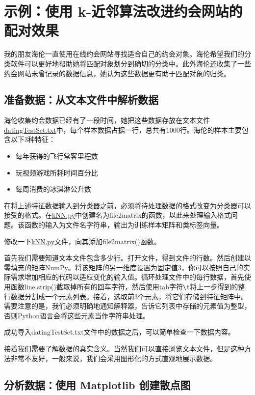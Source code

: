 \section{示例：使用 k-近邻算法改进约会网站的配对效果}
我的朋友海伦一直使用在线约会网站寻找适合自己的约会对象。海伦希望我们的分类软件可以更好地帮助她将匹配对象划分到确切的分类中。此外海伦还收集了一些约会网站未曾记录的数据信息，她认为这些数据更有助于匹配对象的归类。
\subsection{准备数据：从文本文件中解析数据}
海伦收集约会数据已经有了一段时间，她把这些数据存放在文本文件\href{}{datingTestSet.txt}中，每个样本数据占据一行，总共有1000行。海伦的样本主要包含以下3种特征：
\begin{itemize}
    \item 每年获得的飞行常客里程数
    \item 玩视频游戏所耗时间百分比
    \item 每周消费的冰淇淋公升数
\end{itemize}

在将上述特征数据输入到分类器之前，必须将待处理数据的格式改变为分类器可以接受的格式。在\href{https://github.com/JPL-JUNO/Machine-Learning-in-Action/blob/main/Codes/kNN.py}{kNN.py}中创建名为file2matrix的函数，以此来处理输入格式问题。该函数的输入为文件名字符串，输出为训练样本矩阵和类标签向量。

修改一下\href{https://github.com/JPL-JUNO/Machine-Learning-in-Action/blob/main/Codes/kNN.py}{kNN.py}文件，向其添加file2matrix()函数。

首先我们需要知道文本文件包含多少行。打开文件，得到文件的行数。然后创建以零填充的矩阵NumPy。将该矩阵的另一维度设置为固定值3，你可以按照自己的实际需求增加相应的代码以适应变化的输入值。循环处理文件中的每行数据，首先使用函数line.strip()截取掉所有的回车字符，然后使用tab字符\verb|\t|将上一步得到的整行数据分割成一个元素列表。接着，选取前3个元素，将它们存储到特征矩阵中。需要注意的是，我们必须明确地通知解释器，告诉它列表中存储的元素值为整型，否则Python语言会将这些元素当作字符串处理。

成功导入datingTestSet.txt文件中的数据之后，可以简单检查一下数据内容。

接着我们需要了解数据的真实含义。当然我们可以直接浏览文本文件，但是这种方法非常不友好，一般来说，我们会采用图形化的方式直观地展示数据。

\subsection{分析数据：使用 Matplotlib 创建散点图}

